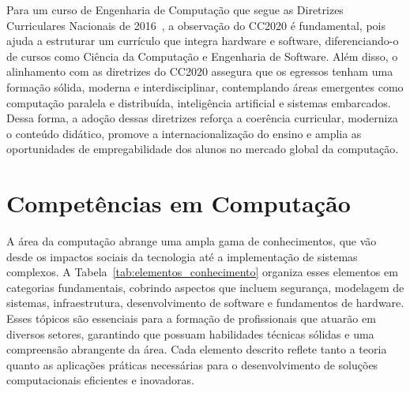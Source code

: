 Para um curso de Engenharia de Computação que segue as Diretrizes Curriculares Nacionais de 2016~\cite{MEC:CNE:CES:5:2016}, a observação do CC2020 é fundamental, pois ajuda a estruturar um currículo que integra hardware e software, diferenciando-o de cursos como Ciência da Computação e Engenharia de Software. Além disso, o alinhamento com as diretrizes do CC2020 assegura que os egressos tenham uma formação sólida, moderna e interdisciplinar, contemplando áreas emergentes como computação paralela e distribuída, inteligência artificial e sistemas embarcados. Dessa forma, a adoção dessas diretrizes reforça a coerência curricular, moderniza o conteúdo didático, promove a internacionalização do ensino e amplia as oportunidades de empregabilidade dos alunos no mercado global da computação.

\section{Competências em Computação}

A área da computação abrange uma ampla gama de conhecimentos, que vão desde os impactos sociais da tecnologia até a implementação de sistemas complexos. A Tabela~\ref{tab:elementos_conhecimento} organiza esses elementos em categorias fundamentais, cobrindo aspectos que incluem segurança, modelagem de sistemas, infraestrutura, desenvolvimento de software e fundamentos de hardware. Esses tópicos são essenciais para a formação de profissionais que atuarão em diversos setores, garantindo que possuam habilidades técnicas sólidas e uma compreensão abrangente da área. Cada elemento descrito reflete tanto a teoria quanto as aplicações práticas necessárias para o desenvolvimento de soluções computacionais eficientes e inovadoras.


